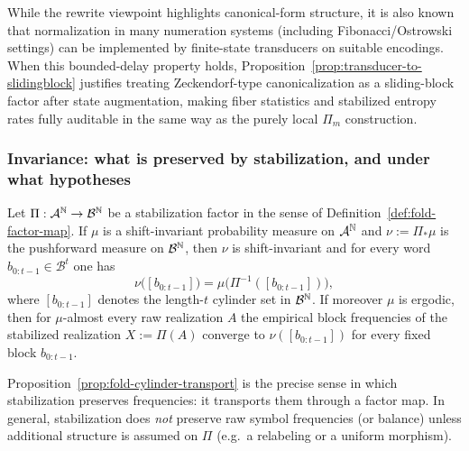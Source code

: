 \begin{remark}
While the rewrite viewpoint highlights canonical-form structure, it is also known that normalization in many numeration systems (including Fibonacci/Ostrowski settings) can be implemented by finite-state transducers on suitable encodings.\cite{AlloucheShallit2003AutomaticSequences}
When this bounded-delay property holds, Proposition~\ref{prop:transducer-to-slidingblock} justifies treating Zeckendorf-type canonicalization as a sliding-block factor after state augmentation, making fiber statistics and stabilized entropy rates fully auditable in the same way as the purely local $\Pi_m$ construction.
\end{remark}

\subsubsection{Invariance: what is preserved by stabilization, and under what hypotheses}\label{sec:stabilization:fold-invariance}

\begin{proposition}\label{prop:fold-cylinder-transport}
Let $\Pi:\mathcal{A}^{\mathbb{N}}\to \mathcal{B}^{\mathbb{N}}$ be a stabilization factor in the sense of Definition~\ref{def:fold-factor-map}. If $\mu$ is a shift-invariant probability measure on $\mathcal{A}^{\mathbb{N}}$ and $\nu:=\Pi_\ast\mu$ is the pushforward measure on $\mathcal{B}^{\mathbb{N}}$, then $\nu$ is shift-invariant and for every word $b_{0:t-1}\in\mathcal{B}^t$ one has
\[
\nu\bigl([b_{0:t-1}]\bigr)=\mu\bigl(\Pi^{-1}([b_{0:t-1}])\bigr),
\]
where $[b_{0:t-1}]$ denotes the length-$t$ cylinder set in $\mathcal{B}^{\mathbb{N}}$.
If moreover $\mu$ is ergodic, then for $\mu$-almost every raw realization $A$ the empirical block frequencies of the stabilized realization $X:=\Pi(A)$ converge to $\nu([b_{0:t-1}])$ for every fixed block $b_{0:t-1}$.
\end{proposition}

\begin{remark}
Proposition~\ref{prop:fold-cylinder-transport} is the precise sense in which stabilization preserves frequencies: it transports them through a factor map. In general, stabilization does \emph{not} preserve raw symbol frequencies (or balance) unless additional structure is assumed on $\Pi$ (e.g.\ a relabeling or a uniform morphism).
\end{remark}

